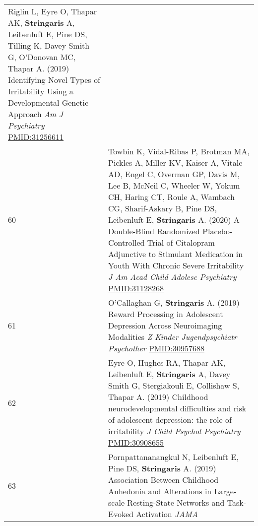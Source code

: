 \documentclass[
]{article}
\begin{document}
\begin{longtable}[]{@{}ll@{}}
\begin{minipage}[t]{0.94\columnwidth}
Riglin L, Eyre O, Thapar AK, \textbf{Stringaris} A, Leibenluft E, Pine
DS, Tilling K, Davey Smith G, O'Donovan MC, Thapar A. (2019) Identifying
Novel Types of Irritability Using a Developmental Genetic Approach
\emph{Am J Psychiatry} \url{PMID:31256611}\strut
\end{minipage}\tabularnewline
\begin{minipage}[t]{0.01\columnwidth}\raggedright
60\strut
\end{minipage} & \begin{minipage}[t]{0.94\columnwidth}\raggedright
Towbin K, Vidal-Ribas P, Brotman MA, Pickles A, Miller KV, Kaiser A,
Vitale AD, Engel C, Overman GP, Davis M, Lee B, McNeil C, Wheeler W,
Yokum CH, Haring CT, Roule A, Wambach CG, Sharif-Askary B, Pine DS,
Leibenluft E, \textbf{Stringaris} A. (2020) A Double-Blind Randomized
Placebo-Controlled Trial of Citalopram Adjunctive to Stimulant
Medication in Youth With Chronic Severe Irritability \emph{J Am Acad
Child Adolesc Psychiatry} \url{PMID:31128268}\strut
\end{minipage}\tabularnewline
\begin{minipage}[t]{0.01\columnwidth}\raggedright
61\strut
\end{minipage} & \begin{minipage}[t]{0.94\columnwidth}\raggedright
O'Callaghan G, \textbf{Stringaris} A. (2019) Reward Processing in
Adolescent Depression Across Neuroimaging Modalities \emph{Z Kinder
Jugendpsychiatr Psychother} \url{PMID:30957688}\strut
\end{minipage}\tabularnewline
\begin{minipage}[t]{0.01\columnwidth}\raggedright
62\strut
\end{minipage} & \begin{minipage}[t]{0.94\columnwidth}\raggedright
Eyre O, Hughes RA, Thapar AK, Leibenluft E, \textbf{Stringaris} A, Davey
Smith G, Stergiakouli E, Collishaw S, Thapar A. (2019) Childhood
neurodevelopmental difficulties and risk of adolescent depression: the
role of irritability \emph{J Child Psychol Psychiatry}
\url{PMID:30908655}\strut
\end{minipage}\tabularnewline
\begin{minipage}[t]{0.01\columnwidth}\raggedright
63\strut
\end{minipage} & \begin{minipage}[t]{0.94\columnwidth}\raggedright
Pornpattananangkul N, Leibenluft E, Pine DS, \textbf{Stringaris} A.
(2019) Association Between Childhood Anhedonia and Alterations in
Large-scale Resting-State Networks and Task-Evoked Activation \emph{JAMA
}
\end{minipage}
\end{longtable}
\end{document}
